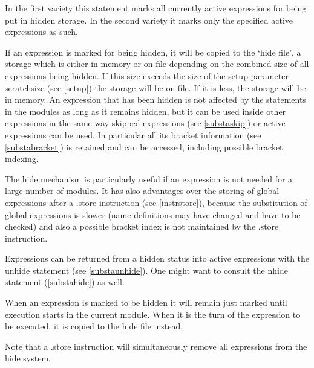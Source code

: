 \noindent In the first variety this statement marks all currently active 
expressions for being put in hidden storage. In the second variety it marks 
only the specified active expressions as such. \vspace{4mm}

\noindent If an expression is marked for being hidden, it will be copied to 
the `hide file', a storage which is 
either in memory or on file depending on the combined size of all 
expressions being hidden. If this size exceeds the size of the setup 
parameter scratchsize (see \ref{setup}) the storage will 
be on file. If it is less, the storage will be in memory. An expression 
that has been hidden is not affected by the statements in the modules as 
long as it remains hidden, but it can be used inside other expressions in 
the same way skipped expressions (see 
\ref{substaskip}) or active expressions can be used. In particular all its 
bracket information (see \ref{substabracket}) is retained 
and can be accessed, including possible bracket 
indexing. \vspace{4mm}

\noindent The hide mechanism is particularly useful if an expression is not 
needed for a large number of modules. It has also advantages over the 
storing of global expressions after a .store instruction (see 
\ref{instrstore}), because the substitution of global expressions is slower 
(name definitions may have changed and have to be checked) and also a 
possible bracket index is not maintained by the .store instruction. 
\vspace{4mm}

\noindent Expressions can be returned from a hidden status into active 
expressions with the unhide statement (see 
\ref{substaunhide}). One might want to consult the nhide 
statement (\ref{substahide}) as well. \vspace{4mm}

\noindent When an expression is marked to be hidden it will remain just 
marked until execution starts in the current module. When it is the turn of 
the expression to be executed, it is copied to the hide file instead. 
\vspace{4mm}

\noindent Note that a .store instruction will simultaneously remove all 
expressions from the hide system. \vspace{10mm}

